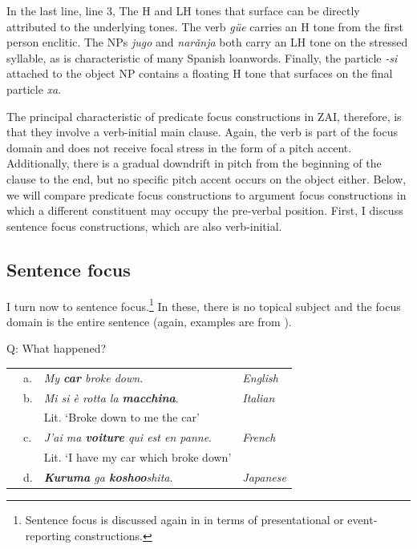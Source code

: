In the last line, line 3, The H and LH tones that surface can be directly attributed to the underlying tones. The verb \textit{g\"{u}e} carries an H tone from the first person enclitic. The NPs \textit{jugo} and  \textit{nar\v{a}nja} both carry an LH tone on the stressed syllable, as is characteristic of many Spanish loanwords. Finally, the particle \textit{-si} attached to the object NP contains a floating H tone that surfaces on the final particle \textit{xa}. 

The principal characteristic of predicate focus constructions in ZAI, therefore, is that they involve a verb-initial main clause. Again, the verb is part of the focus domain and does not receive focal stress in the form of a pitch accent. Additionally, there is a gradual downdrift in pitch from the beginning of the clause to the end, but no specific pitch accent occurs on the object either. Below, we will compare predicate focus constructions to argument focus constructions in which a different constituent may occupy the pre-verbal position. First, I discuss sentence focus constructions, which are also verb-initial.



\subsection{Sentence focus}\label{sfsection}

I turn now to sentence focus.\footnote{Sentence focus is discussed again in  in terms of presentational or event-reporting constructions.} In these, there is no topical subject and the focus domain is the entire sentence (again, examples are from \citet{lambrecht1994}). 


\ea\label{SF}
{Q: What happened?} \\
\begin{table} 
\begin{tabular}{l l l l}
 & a. & \textit{My \textbf{car} broke down}. & \textit{English} \\
 & b. & \textit{Mi si \`{e} rotta la \textbf{macchina}}. & \textit{Italian}  \\
  & & Lit. `Broke down to me the car'  \\
 & c. & \textit{J'ai ma \textbf{voiture} qui est en panne}. & \textit{French}  \\
  & & Lit. `I have my car which broke down' \\
   & d. & \textit{\textbf{Kuruma} ga \textbf{koshoo}shita}. & \textit{Japanese}  \\
\end{tabular}
\end{table}
\z


